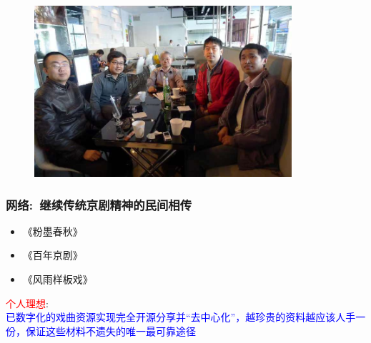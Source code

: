 \documentclass[cjk,slidestop,compress,mathserif,blue]{beamer}
\begin{document}
\frame
{
	\frametitle{}
\begin{figure}[h!]
\centering
\vspace{-0.05in}
\includegraphics[height=0.6\textwidth,width=0.85\textwidth,clip]{Figures_Peking-Opera/PekOpe_Xiyou-2.jpg}
\label{Xiyou-2}
\end{figure}
}

\frame
{
	\frametitle{网络:~继续传统京剧精神的民间相传}
	\begin{itemize}
   		\setlength{\itemsep}{15pt}
		\item 《粉墨春秋》
		\item 《百年京剧》
		\item 《风雨样板戏》
	\end{itemize}
	\textcolor{red}{个人理想}:\\
\textcolor{blue}{已数字化的戏曲资源实现完全开源分享并“去中心化”，越珍贵的资料越应该人手一份，保证这些材料不遗失的唯一最可靠途径}
}
\end{document}
